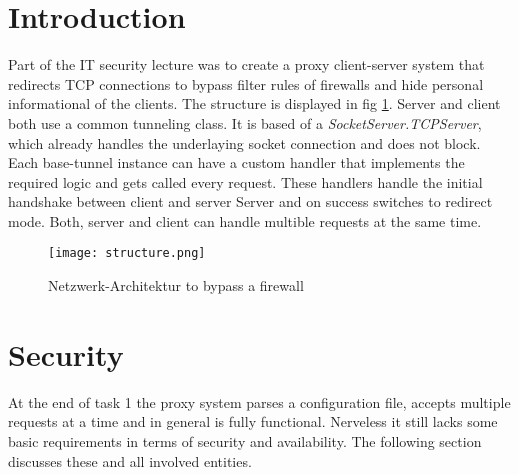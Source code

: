 \documentclass[12pt, a4paper]{scrartcl}
\begin{document}


\tableofcontents
\newpage
{}
\setcounter{lastroman}{\value{page}}

\pagestyle{plain}
\maketitle

\section{Introduction}
Part of the IT security lecture was to create a proxy client-server system that redirects TCP connections to bypass filter rules of firewalls and hide personal informational of the clients. The structure is displayed in fig \ref{fig::arch}. \newline
Server and client both use a common tunneling class. It is based of a \textit{SocketServer.TCPServer}, which already handles the underlaying socket connection and does not block. Each base-tunnel instance can have a custom handler that implements the required logic and gets called every request. These handlers handle the initial handshake between client and server Server and on success switches to redirect mode. Both, server and client can handle multible requests at the same time.

\begin{figure}[H]
    \centering
    \texttt{[image: structure.png]}
    \caption{Netzwerk-Architektur to bypass a firewall}
    \label{fig::arch}
\end{figure}

\newpage
\section{Security}
At the end of task 1 the proxy system parses a configuration file, accepts multiple requests at a time and in general is fully functional. Nerveless it still lacks some basic requirements in terms of security and availability. The following section discusses these and all involved entities.
\end{document}
